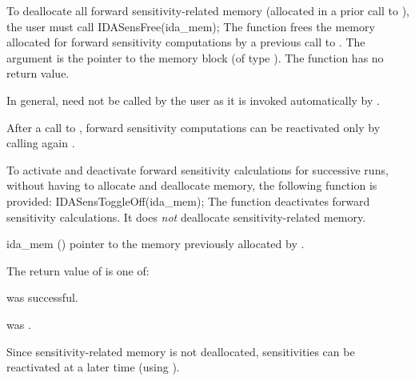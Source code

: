 To deallocate all forward sensitivity-related memory (allocated in a prior call
to ), the user must call
{
  IDASensFree(ida\_mem);
}
{
  The function  frees the memory allocated for forward sensitivity 
  computations by a previous call to .
}
{
  The argument is the pointer to the {\idas} memory block (of type ).
}
{
  The function  has no return value.
}
{
  In general,  need not be called by the user as it is
  invoked automatically by .

  After a call to , forward sensitivity computations can be reactivated
  only by calling again .
}
To activate and deactivate forward sensitivity calculations for successive {\idas} runs,
without having to allocate and deallocate memory, the following function is provided:
{
  IDASensToggleOff(ida\_mem);
}
{
  The function  deactivates forward sensitivity 
  calculations. It does {\em not} deallocate sensitivity-related memory.
}
{
  \begin{args}
  \item[ida\_mem] ()
    pointer to the memory previously allocated by .
  \end{args}
}
{
  The return value  of  is one of:
  \begin{args}
  \item[\Id{IDA\_SUCCESS}] 
     was successful.
  \item[\Id{IDA\_MEM\_NULL}] 
     was .
  \end{args}
}
{
  Since sensitivity-related memory is not deallocated, sensitivities can
  be reactivated at a later time (using ).
}

